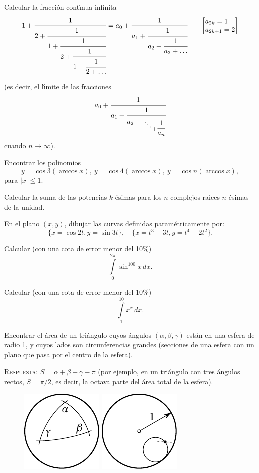 \documentclass[12pt]{article}  %
\begin{document}
\newpage
{} Calcular la fracci\'on cont\'{\i}nua infinita
\begin{align*}
1+\cfrac{1}{2+\cfrac{1}{1+\cfrac{1}{2+\cfrac{1}{1+\cfrac{1}{2+\ldots}}}}}=
a_0+\cfrac{1}{a_1+\cfrac{1}{a_2+\cfrac{1}{a_3+\dots}}} \qquad
\smash{
{\left[\begin{aligned} &a_{2k}=1 \\[-\jot] &a_{2k+1}
      =2 \end{aligned}\right]} }
\end{align*}

\medskip

\noindent (es decir, el l\'{\i}mite de las fracciones
$$
a_0+\cfrac{1}{a_1+\cfrac{1}{a_2+{\atop{\ddots \atop {}} + \cfrac{1}{a_n}}
} 
}
$$
cuando $n \to \infty$).


\bigskip
{} Encontrar los polinomios
\[
y=\cos 3 (\arccos x),\  y=\cos 4 (\arccos x),\ 
y=\cos n (\arccos x),
\] 
para $|x| \leqslant 1$. 


\bigskip
{} Calcular la suma de las potencias $k$-\'esimas para los $n$ complejos ra\'{\i}ces $n$-\'esimas de la unidad.  
 

\bigskip
{} En el plano $(x,y)$, dibujar las curvas definidas param\'etricamente por: 
\[
\{x=\cos 2t, y=\sin 3t\},\quad 
\{x=t^3-3t, y=t^4-2t^2\}.
\]

\bigskip
{} Calcular (con una cota de error menor del 10\%)
$$
\int\limits_0^{2\pi} \sin^{100} x\,dx.
$$

\bigskip
{} Calcular (con una cota de error menor del 10\%)
$$
\int\limits_1^{10} x^x\,dx.
$$

\bigskip
{} Encontrar el \'area de un tri\'angulo cuyos \'angulos $(\alpha, \beta, \gamma)$ est\'an en una esfera de radio 1,
y cuyos lados son circunferencias grandes (secciones de una esfera con un plano que pasa por el centro de la esfera).

\medskip
\textsc{Respuesta:} $S=\alpha+\beta+\gamma-\pi$ (por ejemplo, en un tri\'angulo con tres \'angulos rectos, $S=\pi/2$, es decir, la octava parte del \'area total de la esfera).
\begin{figure}[h]
\centering
 \includegraphics{taskbook-44}\hskip2cm \includegraphics{taskbook-45}
\end{figure}
\end{document}
